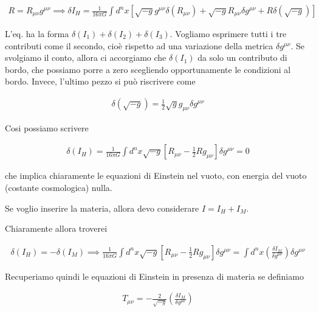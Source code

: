 \documentclass{report}
\begin{document}
\begin{align}
    R = R_{\mu\nu}g^{\mu\nu} \implies \delta I_H = \frac{1}{16\pi G}\int d^n x \left[\sqrt{-g}g^{\mu\nu}\delta(R_{\mu\nu}) + \sqrt{-g}R_{\mu\nu}\delta g^{\mu\nu} + R \delta(\sqrt{-g})\right]
\end{align}

L'eq. ha la forma \(\delta (I_1) + \delta (I_2) + \delta (I_3)\). Vogliamo esprimere tutti i tre contributi come il secondo, cioè rispetto ad una variazione della metrica \(\delta g^{\mu\nu}\). Se svolgiamo il conto, allora ci accorgiamo che \(\delta(I_1)\) da solo un contributo di bordo, che possiamo porre a zero scegliendo opportunamente le condizioni al bordo. Invece, l'ultimo pezzo si può riscrivere come 

\begin{align}
    \delta (\sqrt{-g}) = \frac{1}{2}\sqrt{g}g_{\mu\nu}\delta g^{\mu\nu}
\end{align}


Cosi possiamo scrivere 

\begin{align}
    \delta(I_H) = \frac{1}{16\pi G}\int d^n x \sqrt{-g}\left[R_{\mu\nu} - \frac{1}{2}Rg_{\mu\nu}\right]\delta g^{\mu\nu} = 0 
\end{align}

che implica chiaramente le equazioni di Einstein nel vuoto, con energia del vuoto (costante cosmologica) nulla. 

Se voglio inserire la materia, allora devo considerare \(I = I_H + I_M\). 

Chiaramente allora troverei 

\begin{align}
    \delta(I_H) = -\delta(I_M) \implies \frac{1}{16\pi G}\int d^n x \sqrt{-g}\left[R_{\mu\nu} - \frac{1}{2}Rg_{\mu\nu}\right]\delta g^{\mu\nu} = \int d^n x \left(\frac{\delta I_M}{\delta g^{\mu\nu}} \right)\delta g^{\mu\nu}
\end{align}

Recuperiamo quindi le equazioni di Einstein in presenza di materia se definiamo 

\begin{align}
    T_{\mu\nu} = -\frac{2}{\sqrt{-g}}\left(\frac{\delta I_M}{\delta g^{\mu\nu}} \right)
\end{align}
\end{document}
